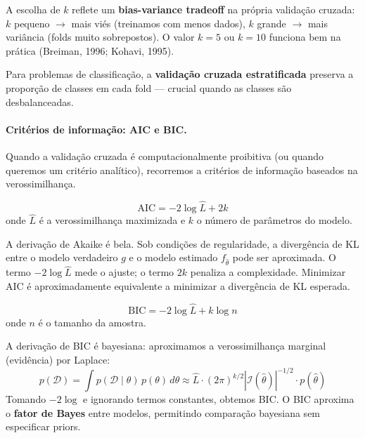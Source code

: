 \documentclass{tufte-handout}
\begin{document}
\begin{remark}
    A escolha de $k$ reflete um \textbf{bias-variance tradeoff} na própria validação cruzada: $k$ pequeno $\to$ mais viés (treinamos com menos dados), $k$ grande $\to$ mais variância (folds muito sobrepostos). O valor $k=5$ ou $k=10$ funciona bem na prática (Breiman, 1996; Kohavi, 1995).
\end{remark}

Para problemas de classificação, a \textbf{validação cruzada estratificada} preserva a proporção de classes em cada fold --- crucial quando as classes são desbalanceadas.

\paragraph{Critérios de informação: AIC e BIC.}

Quando a validação cruzada é computacionalmente proibitiva (ou quando queremos um critério analítico), recorremos a critérios de informação baseados na verossimilhança.

\begin{defn}
    \[
    \text{AIC} = -2\log \hat{L} + 2k
    \]
    onde $\hat{L}$ é a verossimilhança maximizada e $k$ o número de parâmetros do modelo.
\end{defn}

A derivação de Akaike é bela. Sob condições de regularidade, a divergência de KL entre o modelo verdadeiro $g$ e o modelo estimado $f_{\hat{\theta}}$ pode ser aproximada. O termo $-2\log \hat{L}$ mede o ajuste; o termo $2k$ penaliza a complexidade. Minimizar AIC é aproximadamente equivalente a minimizar a divergência de KL esperada.

\begin{defn}
    \[
    \text{BIC} = -2\log \hat{L} + k\log n
    \]
    onde $n$ é o tamanho da amostra.
\end{defn}

A derivação de BIC é bayesiana: aproximamos a verossimilhança marginal (evidência) por Laplace:
\[
p(\mathcal{D}) = \int p(\mathcal{D} \mid \theta) \, p(\theta) \, d\theta \approx \hat{L} \cdot (2\pi)^{k/2} |\mathcal{I}(\hat{\theta})|^{-1/2} \cdot p(\hat{\theta})
\]
Tomando $-2\log$ e ignorando termos constantes, obtemos BIC. O BIC aproxima o \textbf{fator de Bayes} entre modelos, permitindo comparação bayesiana sem especificar priors.
\end{document}
